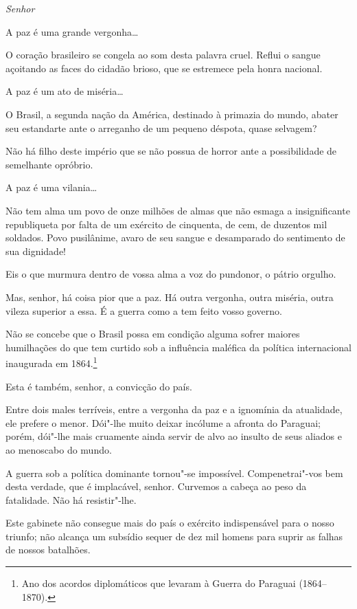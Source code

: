 \begin{linenumbers}

\noindent\textit{Senhor}\smallskip

A paz é uma grande vergonha\ldots{}

 O coração brasileiro se congela ao som desta palavra cruel. Reflui o
sangue açoitando as faces do cidadão brioso, que se estremece pela
honra nacional. 

 A paz é um ato de miséria\ldots{}

 O Brasil, a segunda nação da América, destinado à primazia do mundo,
abater seu estandarte ante o arreganho de um pequeno déspota, quase
selvagem?

 Não há filho deste império que se não possua de horror ante a
possibilidade de semelhante opróbrio.

 A paz é uma vilania\ldots{}

 Não tem alma um povo de onze milhões de almas que não esmaga a
insignificante republiqueta por falta de um exército de cinquenta, de
cem, de duzentos mil soldados. Povo pusilânime, avaro de seu sangue e
desamparado do sentimento de sua dignidade!

 Eis o que murmura dentro de vossa alma a voz do pundonor, o pátrio
orgulho.

 Mas, senhor, há coisa pior que a paz. Há outra vergonha, outra miséria,
outra vileza superior a essa. É a guerra como a tem feito vosso governo. 

 Não se concebe que o Brasil possa em condição alguma sofrer maiores
humilhações do que tem curtido sob a influência maléfica da política
internacional inaugurada em 1864.\footnote{ Ano dos acordos diplomáticos 
que levaram à Guerra do Paraguai (1864--1870).}
 

 Esta é também, senhor, a convicção do país.

 Entre dois males terríveis, entre a vergonha da paz e a ignomínia da
atualidade, ele prefere o menor. Dói"-lhe muito deixar incólume a
afronta do Paraguai; porém, dói"-lhe mais cruamente ainda servir de
alvo ao insulto de seus aliados e ao menoscabo do mundo.

 A guerra sob a política dominante tornou"-se impossível.
Compenetrai"-vos bem desta verdade, que é implacável, senhor. Curvemos
a cabeça ao peso da fatalidade. Não há resistir"-lhe. 

 Este gabinete não consegue mais do país o exército indispensável para o
nosso triunfo; não alcança um subsídio sequer de dez mil homens para
suprir as falhas de nossos batalhões.


\end{linenumbers}
